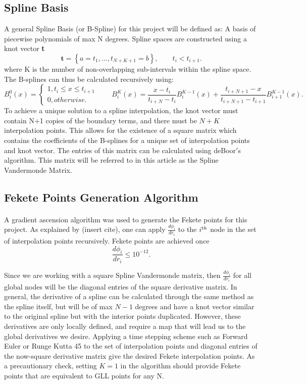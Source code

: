 \documentclass{article}
\begin{document}
\subsection{Spline Basis}
A general Spline Basis (or B-Spline) for this project will be defined as: A basis of piecewise polynomials of max N degrees. Spline spaces are constructed using a knot vector \textbf{t}
\begin{equation*}
\textbf{t}=\left\{a=t_1,...,t_{N+K+1}=b\right\},\qquad t_i<t_{i+1}.
\end{equation*}
where K is the number of non-overlapping sub-intervals within the spline space. The B-splines can thus be calculated recursively using:
\begin{equation*}
B^0_i(x)=\begin{cases}
1, t_i\leq x\leq t_{i+1}\\
0, otherwise.
\end{cases}
\qquad
B^K_i(x)=\frac{x-t_i}{t_{i+N}-t_i}B^{K-1}_i(x)+\frac{t_{i+N+1}-x}{t_{i+N+1}-t_{i+1}}B^{K-1}_{i+1}(x).
\end{equation*}
To achieve a unique solution to a spline interpolation, the knot vector must contain N+1 copies of the boundary terms, and there must be $N+K$ interpolation points. This allows for the existence of a square matrix which contains the coefficients of the B-splines for a unique set of interpolation points and knot vector. The entries of this matrix can be calculated using deBoor$'$s algorithm. This matrix will be referred to in this article as the Spline Vandermonde Matrix.

\subsection{Fekete Points Generation Algorithm}
\paragraph{}
A gradient ascension algorithm was used to generate the Fekete points for this project. As explained by (insert cite), one can apply $\frac{d\phi_i}{dr_i}$ to the $i\textsuperscript{th}$ node in the set of interpolation points recursively. Fekete points are achieved once 
\begin{equation*}\frac{d\phi_i}{dr_i}\leq 10^{-12}.\end{equation*}

Since we are working with a square Spline Vandermonde matrix, then $\frac{d\phi_i}{dr_i}$ for all global nodes will be the diagonal entries of the square derivative matrix. In general, the derivative of a spline can be calculated through the same method as the spline itself, but will be of max $N-1$ degrees and have a knot vector similar to the original spline but with the interior points duplicated. However, these derivatives are only locally defined, and require a map that will lead us to the global derivatives we desire. Applying a time stepping scheme such as Forward Euler or Runge Kutta 45 to the set of interpolation points and diagonal entries of the now-square derivative matrix give the desired Fekete interpolation points. As a precautionary check, setting $K=1$ in the algorithm should provide Fekete points that are equivalent to GLL points for any N.
\end{document}
